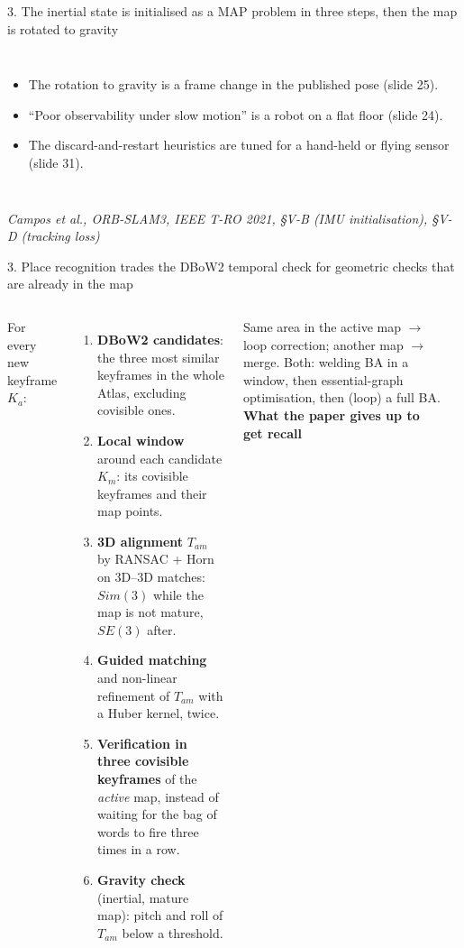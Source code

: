 \documentclass[11pt,aspectratio=169]{beamer}
\newcommand{\src}[1]{\vfill{\tiny\color{black!55}#1}}
\newcommand{\paper}[1]{\textit{#1}}
\begin{document}
\begin{frame}{3. The inertial state is initialised as a MAP problem in three steps, then the map is rotated to gravity}
\begin{columns}[T]
\begin{itemize}
        \item The rotation to gravity is a frame change in the published
              pose (slide 25).
        \item ``Poor observability under slow motion'' is a robot on a flat
              floor (slide 24).
        \item The discard-and-restart heuristics are tuned for a hand-held
              or flying sensor (slide 31).
      \end{itemize}
  \end{columns}
  \src{\paper{Campos et al., ORB-SLAM3, IEEE T-RO 2021, §V-B (IMU initialisation), §V-D (tracking loss)}}
\end{frame}

\begin{frame}{3. Place recognition trades the DBoW2 temporal check for geometric checks that are already in the map}
  \begin{columns}[T]
      \scriptsize
      For every new keyframe $K_a$:
      \begin{enumerate}
        \item \textbf{DBoW2 candidates}: the three most similar keyframes in
              the whole Atlas, excluding covisible ones.
        \item \textbf{Local window} around each candidate $K_m$: its
              covisible keyframes and their map points.
        \item \textbf{3D alignment} $T_{am}$ by RANSAC + Horn on 3D--3D
              matches: $Sim(3)$ while the map is not mature, $SE(3)$ after.
        \item \textbf{Guided matching} and non-linear refinement of $T_{am}$
              with a Huber kernel, twice.
        \item \textbf{Verification in three covisible keyframes} of the
              \emph{active} map, instead of waiting for the bag of words to
              fire three times in a row.
        \item \textbf{Gravity check} (inertial, mature map): pitch and roll of
              $T_{am}$ below a threshold.
      \end{enumerate}
      Same area in the active map $\rightarrow$ loop correction; another
      map $\rightarrow$ merge. Both: welding BA in a window, then
      essential-graph optimisation, then (loop) a full BA.
      \scriptsize
      \textbf{What the paper gives up to get recall}
      \begin{itemize}

\end{itemize}
\end{columns}
\end{frame}
\end{document}
